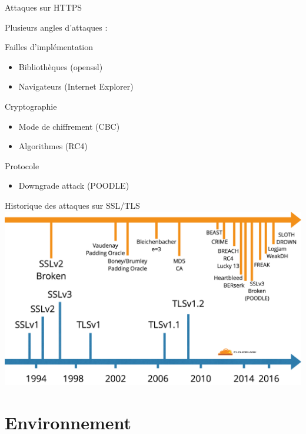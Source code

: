 \documentclass{bredelebeamer}
\begin{document}
\begin{frame}{Attaques sur HTTPS}

  {\Large \centerline{Plusieurs angles d'attaques :}}

  \begin{exampleblock}{Failles d'implémentation}
    \begin{itemize}
    \item Bibliothèques (openssl)
    \item Navigateurs (Internet Explorer)
    \end{itemize}
    \end{exampleblock}

  \begin{exampleblock}{Cryptographie}
    \begin{itemize}
    \item Mode de chiffrement (CBC)
    \item Algorithmes (RC4)
    \end{itemize}
  \end{exampleblock}

  \begin{exampleblock}{Protocole}
    \begin{itemize}
      \item{Downgrade attack (POODLE)}
    \end{itemize}
  \end{exampleblock}

\end{frame}

\begin{frame}{Historique des attaques sur SSL/TLS}
    \includegraphics[width=\linewidth]{../medias/history-tls-attacks.png}
\end{frame}

\section{Environnement}
\end{document}
